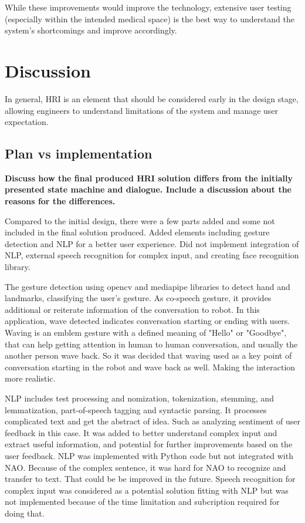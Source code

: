 \documentclass[conference]{IEEEtran}
\begin{document}
While these improvements would improve the technology, extensive user testing (especially within the intended medical space) is the 
best way to understand the system's shortcomings and improve accordingly.


\section{Discussion}
In general, HRI is an element that should be considered early in the design stage, allowing engineers to understand limitations of the system and manage user expectation.
\subsection{Plan vs implementation}
\textbf{Discuss how the final produced HRI solution differs from the initially presented state machine and dialogue. Include a discussion about the reasons for the differences.}

Compared to the initial design, there were a few parts added and some not included in the final solution produced. Added elements including gesture detection and NLP for a better user experience. Did not implement integration of NLP, external speech recognition for complex input, and creating face recognition library.

The gesture detection using opencv and mediapipe libraries to detect hand and landmarks, classifying the user's gesture. As co-speech gesture, it provides additional or reiterate information of the conversation to robot. In this application, wave detected indicates conversation starting or ending with users. Waving is an emblem gesture with a defined meaning of "Hello" or "Goodbye", that can help getting attention in human to human conversation, and usually the another person wave back. So it was decided that waving used as a key point of conversation starting in the robot and wave back as well. Making the interaction more realistic.

NLP includes test processing and nomization, tokenization, stemming, and lemmatization, part-of-speech tagging and syntactic parsing. It processes complicated text and get the abstract of idea. Such as analyzing sentiment of user feedback in this case. It was added to better understand complex input and extract useful information, and potential for further improvements based on the user feedback. NLP was implemented with Python code but not integrated with NAO. Because of the complex sentence, it was hard for NAO to recognize and transfer to text. That could be be improved in the future. Speech recognition for complex input was considered as a potential solution fitting with NLP but was not implemented because of the time limitation and subcription required for doing that.
\end{document}
